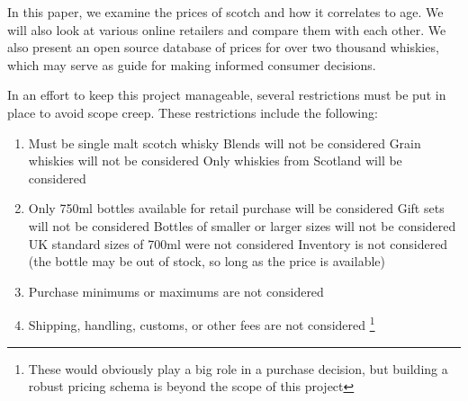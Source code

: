 In this paper, we examine the prices of scotch and how it correlates to age. We will also look at various online retailers and compare them with each other. We also present an open source database of prices for over two thousand whiskies, which may serve as guide for making informed consumer decisions.

In an effort to keep this project manageable, several restrictions must be put in place to avoid scope creep. These restrictions include the following:

\begin{enumerate}
  \item Must be single malt scotch whisky
    \subitem Blends will not be considered
    \subitem Grain whiskies will not be considered
    \subitem Only whiskies from Scotland will be considered
  \item Only 750ml bottles available for retail purchase will be considered
    \subitem Gift sets will not be considered
    \subitem Bottles of smaller or larger sizes will not be considered
    \subitem UK standard sizes of 700ml were not considered
    \subitem Inventory is not considered (the bottle may be out of stock, so long as the price is available)
  \item Purchase minimums or maximums are not considered
  \item Shipping, handling, customs, or other fees are not considered \footnote{These would obviously play a big role in a purchase decision, but building a robust pricing schema is beyond the scope of this project}
\end{enumerate}







